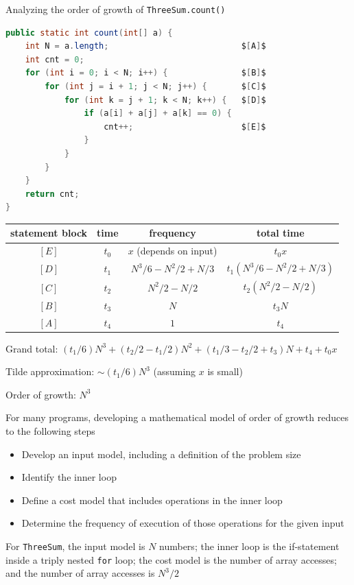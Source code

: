 \documentclass[8pt,a4paper,compress]{beamer}
\begin{document}
\begin{frame}[fragile]
\pause

Analyzing the order of growth of \lstinline{ThreeSum.count()}
\begin{lstlisting}[language=Java, mathescape]
public static int count(int[] a) {
    int N = a.length;                           $[A]$
    int cnt = 0;
    for (int i = 0; i < N; i++) {               $[B]$ 
        for (int j = i + 1; j < N; j++) {       $[C]$
            for (int k = j + 1; k < N; k++) {   $[D]$
                if (a[i] + a[j] + a[k] == 0) {
                    cnt++;                      $[E]$
                }
            }
        }
    }
    return cnt;
}
\end{lstlisting}

\pause

\begin{center}
\begin{tabular}{cccc}
statement block & time & frequency & total time\\ \hline
$[E]$ & $t_0$ & $x$ (depends on input) & $t_0x$ \\
$[D]$ & $t_1$ & $N^3/6-N^2/2+N/3$  & $t_1(N^3/6-N^2/2+N/3)$ \\
$[C]$ & $t_2$ & $N^2/2-N/2$  & $t_2(N^2/2-N/2)$ \\
$[B]$ & $t_3$ & $N$  & $t_3N$ \\
$[A]$ & $t_4$ & $1$  & $t_4$ 
\end{tabular} 
\end{center}

\pause

Grand total: $(t_1/6)N^3+(t_2/2-t_1/2)N^2+(t_1/3-t_2/2+t_3)N+t_4+t_0x$

\pause
\smallskip

Tilde approximation: $\sim(t_1/6)N^3$ (assuming $x$ is small)

\pause
\smallskip

Order of growth: $N^3$
\end{frame}

\begin{frame}[fragile]
\pause

For many programs, developing a mathematical model of order of growth reduces to the following steps
\begin{itemize}
\item Develop an input model, including a definition of the problem size
\item Identify the inner loop
\item Define a cost model that includes operations in the inner loop
\item Determine the frequency of execution of those operations for the given input
\end{itemize}

\pause
\bigskip

For \lstinline{ThreeSum}, the input model is $N$ numbers; the inner loop is the if-statement inside a triply nested \lstinline{for} loop; the cost model is the number of array accesses; and the number of array accesses is $N^3/2$
\end{frame}
\end{document}

